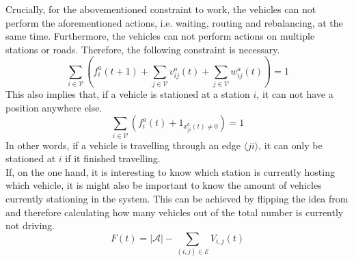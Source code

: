Crucially, for the abovementioned constraint to work, the vehicles can not perform the aforementioned actions, i.e. waiting, routing and rebalancing, at the same time. Furthermore, the vehicles can not perform actions on multiple stations or roads. Therefore, the following constraint is necessary. \\
\begin{equation}
	\sum_{i \in \mathcal{V}}(f^a_{i}(t+1)+\sum_{j \in \mathcal{V}}v^a_{ij}(t) + \sum_{j \in \mathcal{V}}w^a_{ij}(t)) = 1\label{eq:no_3_actions}
\end{equation}
This also implies that, if a vehicle is stationed at a station $i$, it can not have a position anywhere else. 
\begin{equation}
	\sum_{i \in \mathcal{V}}(f^a_{i}(t)+1_{ x^a_{ji}(t)\neq 0}) =1 \label{eq:position_station}
\end{equation}
In other words, if a vehicle is travelling through an edge $\langle ji\rangle$, it can only be stationed at $i$ if it finished travelling. \\
 If, on the one hand, it is interesting to know which station is currently hosting which vehicle, it is might also be important to know the amount of vehicles currently stationing in the system. This can be achieved by flipping the idea from  and therefore calculating how many vehicles out of the total number is currently not driving. 
\begin{equation}
	F(t) = |\mathcal{A}| - \sum_{(i,j) \in \mathcal{E}}V_{i,j}(t)%
\end{equation}


